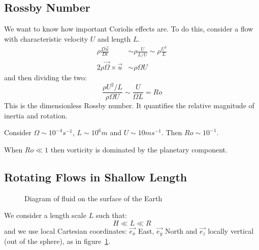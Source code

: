 \documentclass[../Main.tex]{subfiles}
\begin{document}
\subsection{Rossby Number}
We want to know how important Coriolis effects are. To do this, consider a flow with characteristic velocity $U$ and length $L$.
\begin{align*}
    \rho \frac{D \vec{u}}{D t} &\sim \rho \frac{U}{L / U} \sim \rho\frac{U^2}{L} \\
    2\rho \vec{\Omega} \times \vec{u} &\sim \rho \Omega U
\end{align*}
and then dividing the two:
\begin{equation*}
    \frac{\rho U^2 / L}{\rho \Omega U} \sim \frac{U}{\Omega L} = Ro
\end{equation*}
This is the dimensionless Rossby number. It quantifies the relative magnitude of inertia and rotation.
\begin{example}
    Consider $\Omega \sim 10^{-4} s^{-1}$, $L \sim 10^6 m$ and $U \sim 10 ms^{-1}$. Then $Ro \sim 10^{-1}$.
\end{example}
When $Ro \ll 1$ then vorticity is dominated by the planetary component.
\subsection{Rotating Flows in Shallow Length}
\begin{figure}
    \centering
    \caption{Diagram of fluid on the surface of the Earth}
    \label{figEarthFluid}
\end{figure}
We consider a length scale $L$ such that:
\begin{equation*}
    H \ll L \ll R
\end{equation*}
and we use local Cartesian coordinates: $\vec{e_x}$ East, $\vec{e_y}$ North and $\vec{e_z}$ locally vertical (out of the sphere), as in figure~\ref{figEarthFluid}.
\end{document}
